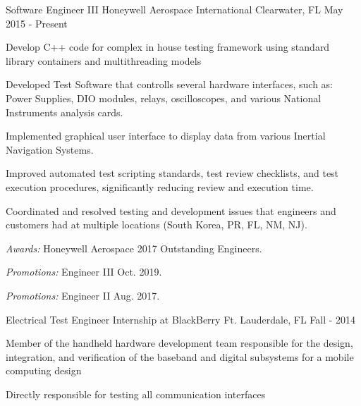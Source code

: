 

\begin{cventries}

  \cventry
    {Software Engineer III} %
    {Honeywell Aerospace International} %
    {Clearwater, FL} %
    {May 2015 - Present} %
    {
      \begin{cvitems} %
        \item {Develop C++ code for complex in house testing framework using standard library containers and multithreading models}
				\item {Developed Test Software that controlls several hardware interfaces, such as: Power Supplies, DIO modules, relays, oscilloscopes, and various National Instruments analysis cards.}
        \item {Implemented graphical user interface to display data from various Inertial Navigation Systems.}
				\item {Improved automated test scripting standards, test review checklists, and test execution procedures, significantly reducing review and execution time.}
        \item {Coordinated and resolved testing and development issues that engineers and customers had at multiple locations (South Korea, PR, FL, NM, NJ).}
				\item {{\it Awards:} Honeywell Aerospace 2017 Outstanding Engineers.}
				\item {{\it Promotions:} Engineer III Oct. 2019.}
				\item {{\it Promotions:} Engineer II Aug. 2017.}
      \end{cvitems}
    }

	\cventry
		{Electrical Test Engineer} %
		{Internship at BlackBerry} %
		{Ft. Lauderdale, FL} %
		{Fall - 2014} %
		{
			\begin{cvitems} %
			\item {Member of the handheld hardware development team responsible for the design, integration, and verification of the baseband and digital subsystems for a mobile computing design}
			\item {Directly responsible for testing all communication interfaces}
			\end{cvitems}
		}
\end{cventries}
